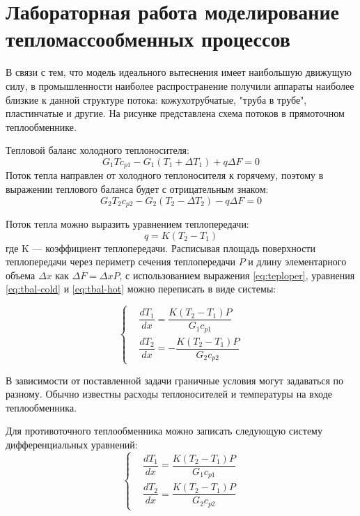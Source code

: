 ﻿\section*{Лабораторная работа моделирование тепломассообменных процессов}

В связи с тем, что модель идеального вытеснения имеет наибольшую движущую силу, в промышленности наиболее распространение получили аппараты наиболее близкие к данной структуре потока: кожухотрубчатые, "труба в трубе", пластинчатые и другие. На рисунке представлена схема потоков в прямоточном теплообменнике. 

Тепловой баланс холодного теплоносителя:
\begin{equation}\label{eq:tbal-cold}
	G_1 T c_{p1}-G_1 (T_1+\Delta T_1) + q \Delta F=0
\end{equation}
Поток тепла направлен от холодного теплоносителя к горячему, поэтому в выражении теплового баланса будет с отрицательным знаком:
\begin{equation}\label{eq:tbal-hot}
	G_2 T_2 c_{p2} -G_2 (T_2 - \Delta T_2) -q \Delta F =0
\end{equation}

Поток тепла можно выразить уравнением теплопередачи:
\begin{equation}\label{eq:teploper}
	q=K(T_2-T_1)
\end{equation}
где K --- коэффициент теплопередачи. Расписывая площадь поверхности теплопередачи через периметр сечения теплопередачи $P$ и длину элементарного объема $\Delta x$ как $\Delta F = \Delta x P$, с использованием выражения \ref{eq:teploper}, уравнения \ref{eq:tbal-cold} и \ref{eq:tbal-hot} можно переписать в виде системы:

 \begin{equation}
 \left\{
 \begin{aligned}
 &\dfrac{dT_1}{dx}=\dfrac{K(T_2-T_1)P}{G_1 c_{p1}}        \\
 &\dfrac{dT_2}{dx}=-\dfrac{K(T_2-T_1)P}{G_2 c_{p2}}            
 \end{aligned}
 \right.
 \end{equation}

В зависимости от поставленной задачи граничные условия могут задаваться по разному. Обычно известны расходы теплоносителей и температуры на входе теплообменника.

Для противоточного теплообменника можно записать следующую систему дифференциальных уравнений:
 \begin{equation}
 \left\{
 \begin{aligned}
 &\dfrac{dT_1}{dx}=\dfrac{K(T_2-T_1)P}{G_1 c_{p1}}        \\
 &\dfrac{dT_2}{dx}=\dfrac{K(T_2-T_1)P}{G_2 c_{p2}}            
 \end{aligned}
 \right.
 \end{equation}
 
